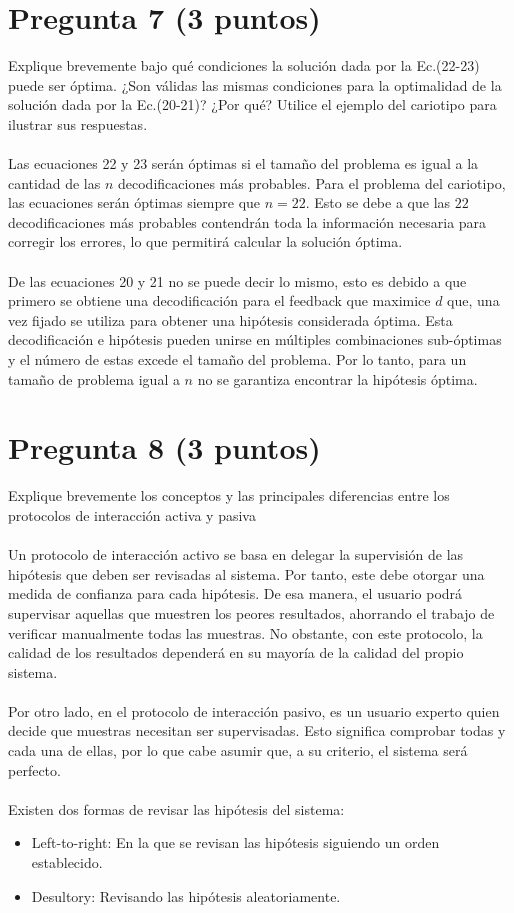 \documentclass[12pt]{article}
\begin{document}
\newpage

\section*{Pregunta 7 (3 puntos)}
Explique brevemente bajo qué condiciones la solución dada por la Ec.(22-23) puede ser óptima. ¿Son válidas las mismas condiciones para la optimalidad de la solución dada por la Ec.(20-21)? ¿Por qué? Utilice el ejemplo del cariotipo para ilustrar sus respuestas.
\\\\
Las ecuaciones 22 y 23 serán óptimas si el tamaño del problema es igual a la cantidad de las $n$ decodificaciones más probables. Para el problema del cariotipo, las ecuaciones serán óptimas siempre que $n = 22$. Esto se debe a que las $22$ decodificaciones más probables contendrán toda la información necesaria para corregir los errores, lo que permitirá calcular la solución óptima.
\\\\
De las ecuaciones 20 y 21 no se puede decir lo mismo, esto es debido a que primero se obtiene una decodificación para el feedback que maximice $d$ que, una vez fijado se utiliza para obtener una hipótesis considerada óptima. Esta decodificación e hipótesis pueden unirse en múltiples combinaciones sub-óptimas y el número de estas excede el tamaño del problema. Por lo tanto, para un tamaño de problema igual a $n$ no se garantiza encontrar la hipótesis óptima.
\newpage

\section*{Pregunta 8 (3 puntos)}
Explique brevemente los conceptos y las principales diferencias entre los protocolos de interacción activa y pasiva
\\\\
Un protocolo de interacción activo se basa en delegar la supervisión de las hipótesis que deben ser revisadas al sistema. Por tanto, este debe otorgar una medida de confianza para cada hipótesis. De esa manera, el usuario podrá supervisar aquellas que muestren los peores resultados, ahorrando el trabajo de verificar manualmente todas las muestras. No obstante, con este protocolo, la calidad de los resultados dependerá en su mayoría de la calidad del propio sistema.
\\\\
Por otro lado, en el protocolo de interacción pasivo, es un usuario experto quien decide que muestras necesitan ser supervisadas. Esto significa comprobar todas y cada una de ellas, por lo que cabe asumir que, a su criterio, el sistema será perfecto.
\\\\
Existen dos formas de revisar las hipótesis del sistema:

\begin{itemize}
    \item Left-to-right: En la que se revisan las hipótesis siguiendo un orden establecido.
    \item Desultory: Revisando las hipótesis aleatoriamente.
  \end{itemize}
\end{document}
